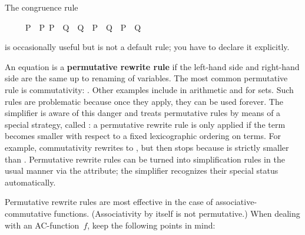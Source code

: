 \begin{isabellebody}
\begin{isamarkuptext}
\begin{warn}
The congruence rule 
\begin{isabelle}%
\ \ \ \ \ {\isasymlbrakk}P\ {\isacharequal}\ P{\isacharprime}{\isacharsemicolon}\ P{\isacharprime}\ {\isasymLongrightarrow}\ Q\ {\isacharequal}\ Q{\isacharprime}{\isasymrbrakk}\ {\isasymLongrightarrow}\ {\isacharparenleft}P\ {\isasymand}\ Q{\isacharparenright}\ {\isacharequal}\ {\isacharparenleft}P{\isacharprime}\ {\isasymand}\ Q{\isacharprime}{\isacharparenright}%
\end{isabelle}
\par\noindent
is occasionally useful but is not a default rule; you have to declare it explicitly.
\end{warn}%
\end{isamarkuptext}%
\isamarkuptrue%
%
\isamarkuptrue%
%
\begin{isamarkuptext}%
%
An equation is a \textbf{permutative rewrite rule} if the left-hand
side and right-hand side are the same up to renaming of variables.  The most
common permutative rule is commutativity: .  Other examples
include  in arithmetic and  for sets. Such rules are problematic because
once they apply, they can be used forever. The simplifier is aware of this
danger and treats permutative rules by means of a special strategy, called
: a permutative rewrite
rule is only applied if the term becomes smaller with respect to a fixed
lexicographic ordering on terms. For example, commutativity rewrites
 to , but then stops because  is strictly
smaller than .  Permutative rewrite rules can be turned into
simplification rules in the usual manner via the  attribute; the
simplifier recognizes their special status automatically.

Permutative rewrite rules are most effective in the case of
associative-commutative functions.  (Associativity by itself is not
permutative.)  When dealing with an AC-function~$f$, keep the
following points in mind:
\begin{itemize}
  

\end{itemize}
\end{isamarkuptext}
\end{isabellebody}
